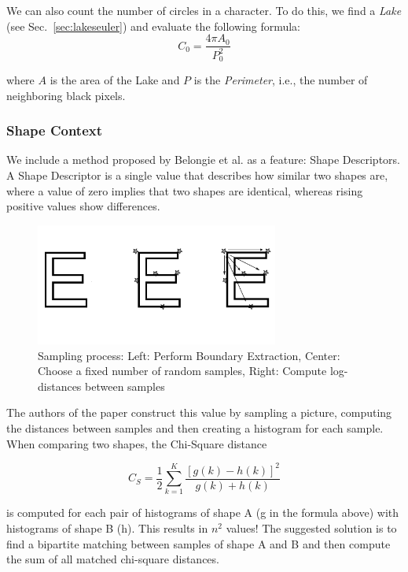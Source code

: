 \documentclass{article}
\begin{document}
We can also count the number of circles in a character. To do this, we find a \textit{Lake} (see Sec.~\ref{sec:lakeseuler}) and evaluate the following formula:
\begin{equation}
C_0 = \frac{4\pi A_0}{P_0^2}
\end{equation}

where $A$ is the area of the Lake and $P$ is the \textit{Perimeter}, i.e., the number of neighboring black pixels.

\subsubsection{Shape Context}
We include a method proposed by Belongie et al. \cite{Belongie00shapecontext:} as a feature: Shape Descriptors. A Shape Descriptor is a single value that describes how similar two shapes are, where a value of zero implies that two shapes are identical, whereas rising positive values show differences. 

\begin{figure}
 \centering
 \includegraphics[width=8cm]{images/samples.png}
 \caption{Sampling process: Left: Perform Boundary Extraction, Center: Choose a fixed number of random samples, Right: Compute log-distances between samples}
 \label{fig:samples}
\end{figure}

The authors of the paper construct this value by sampling a picture, computing the distances between samples and then creating a histogram for each sample. When comparing two shapes, the Chi-Square distance 

\begin{displaymath}
C_S = \frac{1}{2} \sum\limits^K_{k=1} \frac{\left[g(k) - h(k)\right]^2}{g(k)+h(k)}
\end{displaymath}

is computed for each pair of histograms of shape A (g in the formula above) with histograms of shape B (h). This results in $n^2$ values! The suggested solution is to find a bipartite matching between samples of shape A and B and then compute the sum of all matched chi-square distances.
\end{document}
